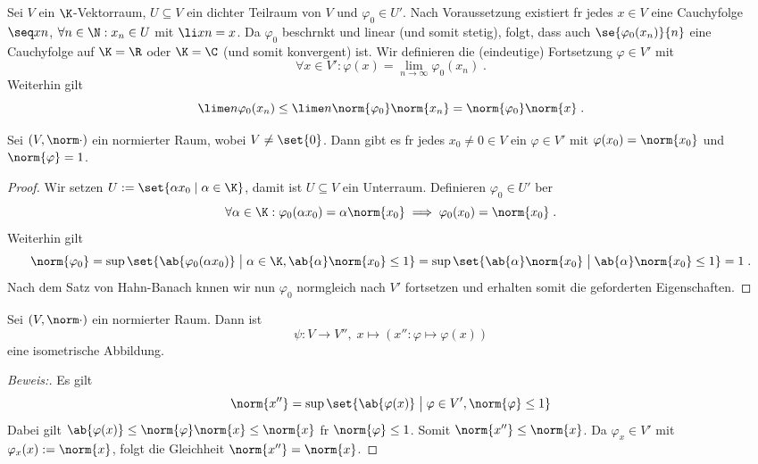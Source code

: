 	\begin{ex}
		Sei $V$ ein $\K$-Vektorraum, \(U\subseteq V\) ein dichter Teilraum von $V$ und \(\varphi_0\in U'\). Nach Voraussetzung existiert f\us r jedes \(x\in V\) eine Cauchyfolge  \(\seq xn\), \(\forall n\in \N: x_n \in U\) mit \(\li xn = x\). Da $\varphi_0$ beschr\as nkt und linear (und somit stetig), folgt, dass auch \(\se{\varphi_0(x_n)}{n}\) eine Cauchyfolge auf  \(\K = \R\) oder \(\K = \C\) (und somit konvergent) ist. Wir definieren die (eindeutige) Fortsetzung \(\varphi \in V'\) mit
		\[\forall x\in V' : \varphi(x) = \lim_{n\to\infty} \varphi_0(x_n)\;.\]
		Weiterhin gilt
		\[\lime n \varphi_0(x_n) \leq \lime n\norm{\varphi_0} \norm{x_n} = \norm{\varphi_0}\norm{x}\;. \]
	\end{ex} 
	
	\begin{theorem}
		Sei \((V,\norm\cdot)\) ein normierter Raum, wobei \(V \neq \set{0}\). Dann gibt es f\us r jedes \(x_0\neq 0 \in V\) ein \(\varphi \in V'\) mit \(\varphi(x_0) = \norm{x_0}\) und \(\norm{\varphi} = 1\).
	\end{theorem}
	\begin{proof}
		Wir setzen \(U:=\set{\alpha x_0\;\vert\; \alpha \in \K}\), damit ist \(U\subseteq V\) ein Unterraum. Definieren \(\varphi_0\in U'\) \us ber 
		\[\forall \alpha \in \K: \varphi_0(\alpha x_0) = \alpha \norm{x_0} \implies \varphi_0(x_0) = \norm{x_0}\;.\]
		Weiterhin gilt
		\[\norm{\varphi_0} = \sup \set{\ab{\varphi_0(\alpha x_0)} \;\big\vert\; \alpha \in \K, \ab{\alpha}\norm{x_0} \leq 1} = \sup \set{\ab{\alpha} \norm{x_0} \;\big\vert\; \ab{\alpha}\norm{x_0} \leq 1} = 1\;.\]
		Nach dem Satz von Hahn-Banach k\os nnen wir nun \(\varphi_0\) normgleich nach \(V'\) fortsetzen und erhalten somit die geforderten Eigenschaften.
	\end{proof}	
	
	\begin{theorem}
		\label{Doppeldual_1} Sei \((V,\norm\cdot)\) ein normierter Raum. Dann ist 
		\[\psi: V \to V'',\; x \mapsto (x'':\varphi \mapsto \varphi(x))\]
		eine isometrische Abbildung.
	\end{theorem}
	\begin{proof}[Beweis:]
		Es gilt 
		\[\norm{x''} = \sup\set{\ab{\varphi(x)} \;\big\vert\;\varphi\in V', \norm{\varphi} \leq 1} \]
		Dabei gilt \(\ab{\varphi(x)} \leq \norm{\varphi}\norm{x} \leq \norm{x}\) f\us r \(\norm{\varphi}\leq 1\). Somit \(\norm{x''} \leq \norm{x}\). Da \(\varphi_x \in V'\) mit \(\varphi_x(x):= \norm{x}\), folgt die Gleichheit \(\norm{x''} = \norm{x}\).
			
	\end{proof}
	
